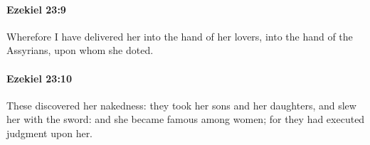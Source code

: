 		\paragraph{Ezekiel 23:9} %
			\label{EZEKIEL-23-9}

			Wherefore I have delivered her into the hand of her lovers, into the hand of the Assyrians, upon whom she doted.


		\paragraph{Ezekiel 23:10} %
			\label{EZEKIEL-23-10}

			These discovered her nakedness: they took her sons and her daughters, and slew her with the sword: and she became famous among women; for they had executed judgment upon her.


